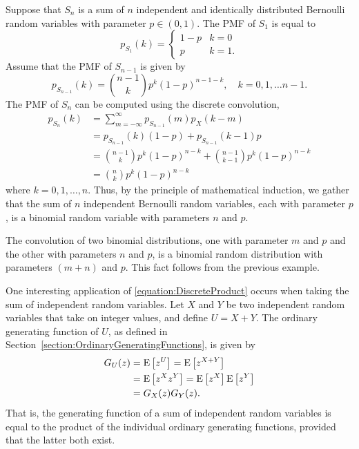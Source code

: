 \begin{example}
Suppose that $S_n$ is a sum of $n$ independent and identically distributed Bernoulli random variables with parameter $p \in (0,1)$.
The PMF of $S_1$ is equal to
\begin{equation*}
p_{S_1} (k) = \begin{cases} 1 - p & k = 0 \\
p & k = 1 .  \end{cases}
\end{equation*}
Assume that the PMF of $S_{n-1}$ is given by
\begin{equation*}
p_{S_{n-1}} (k)
= \binom{n-1}{k} p^k (1-p)^{n-1-k} ,
\quad k = 0, 1, \ldots n-1 .
\end{equation*}
The PMF of $S_n$ can be computed using the discrete convolution,
\begin{equation*}
\begin{split}
p_{S_n} (k) &= \sum_{m = - \infty}^{\infty} p_{S_{n-1}}(m) p_X(k-m) \\
&= p_{S_{n-1}}(k) (1-p) + p_{S_{n-1}}(k-1) p \\
&= \binom{n-1}{k} p^{k} (1-p)^{n-k} + \binom{n-1}{k-1} p^{k} (1-p)^{n-k} \\
&= \binom{n}{k} p^{k} (1-p)^{n-k}
\end{split}
\end{equation*}
where $k = 0, 1, \ldots, n$.
Thus, by the principle of mathematical induction, we gather that the sum of $n$ independent Bernoulli random variables, each with parameter $p$, is a binomial random variable with parameters $n$ and $p$.
\end{example}

The convolution of two binomial distributions, one with parameter $m$ and $p$ and the other with parameters $n$ and $p$, is a binomial random distribution with parameters $(m+n)$ and $p$.
This fact follows from the previous example.

One interesting application of \eqref{equation:DiscreteProduct} occurs when taking the sum of independent random variables.
Let $X$ and $Y$ be two independent random variables that take on integer values, and define $U = X + Y$.
The ordinary generating function of $U$, as defined in Section~\ref{section:OrdinaryGeneratingFunctions}, is given by
\begin{equation*}
\begin{split}
G_U (z) &= \mathrm{E} \left[ z^U \right]
= \mathrm{E} \left[ z^{X + Y} \right] \\
&= \mathrm{E} \left[ z^X z^Y \right]
= \mathrm{E} \left[ z^X \right] \mathrm{E} \left[ z^Y \right] \\
&= G_X(z) G_Y(z) .
\end{split}
\end{equation*}
That is, the generating function of a sum of independent random variables is equal to the product of the individual ordinary generating functions, provided that the latter both exist.

